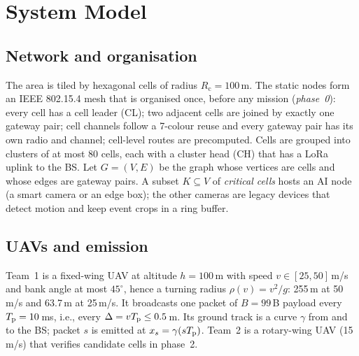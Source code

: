 \section{System Model}\label{sec:model}
\subsection{Network and organisation}
The area is tiled by hexagonal cells of radius $R_{\mathrm c}=100$\,m. The static nodes form an IEEE 802.15.4 mesh that
is organised once, before any mission (\emph{phase~0}): every cell has a cell leader (CL); two adjacent cells are joined
by exactly one gateway pair; cell channels follow a 7-colour reuse and every gateway pair has its own radio and channel;
cell-level routes are precomputed. Cells are grouped into clusters of at most 80 cells, each with a cluster head (CH) that
has a LoRa uplink to the BS. Let $G=(V,E)$ be the graph whose vertices are cells and whose edges are gateway pairs. A
subset $K\subseteq V$ of \emph{critical cells} hosts an AI node (a smart camera or an edge box); the other cameras are
legacy devices that detect motion and keep event crops in a ring buffer.

\subsection{UAVs and emission}
Team~1 is a fixed-wing UAV at altitude $h=100$\,m with speed $v\in[25,50]$\,m/s and bank angle at most $45^\circ$, hence a
turning radius $\rho(v)=v^2/g$: 255\,m at 50\,m/s and 63.7\,m at 25\,m/s. It broadcasts one packet of $B=99$\,B payload
every $T_{\mathrm p}=10$\,ms, i.e., every $\Delta=vT_{\mathrm p}\le 0.5$\,m. Its ground track is a curve $\gamma$ from and to the BS; packet
$s$ is emitted at $x_s=\gamma(sT_{\mathrm p})$. Team~2 is a rotary-wing UAV (15\,m/s) that verifies candidate cells in phase~2.

